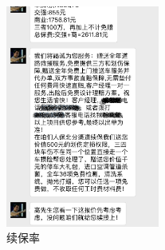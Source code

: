\documentclass[professionalfont]{beamer}
\begin{document}
\begin{frame}
	\begin{figure}
		\includegraphics[width=0.45\textwidth]{Plots/retation.jpg}
		\caption{续保率}
	\end{figure}
\end{frame}
\end{document}
